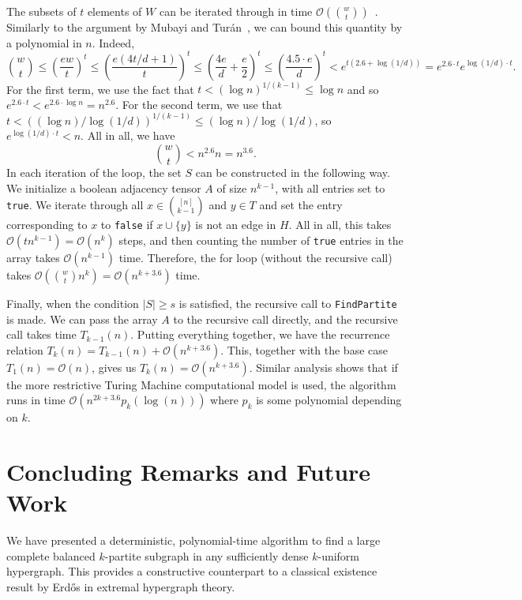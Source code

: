 \documentclass{amsart}
\newcommand{\bigO}[1]{\ensuremath{\mathcal{O}\left(#1\right)}}
\begin{document}
    The subsets of $t$ elements of $W$ can be iterated through in time $\bigO{\binom{w}{t}}$~\cite{reingold1977combinatorial}.
    Similarly to the argument by Mubayi and Tur\'{a}n~\cite{MUBAYI2010174}, we can bound this quantity by a polynomial in $n$.
    Indeed,
    \[
        \binom{w}{t} \leq \left(\frac{ew}{t}\right)^t
        \leq \left(\frac{e(4t/d + 1)}{t}\right)^t
        \leq \left(\frac{4e}{d} + \frac{e}{2}\right)^t
        \leq \left(\frac{4.5 \cdot e}{d}\right)^t < e^{t(2.6 + \log (1/d))}
        = e^{2.6 \cdot t} e^{\log (1/d) \cdot t}.
    \]
    For the first term, we use the fact that $t < (\log n)^{1/(k-1)} \leq \log n$
    and so ${e^{2.6 \cdot t} < e^{2.6 \cdot \log n} = n^{2.6}}$.
    For the second term, we use that $t < ((\log n)/\log(1/d))^{1/(k-1)} \leq (\log n)/\log(1/d)$,
    so $e^{\log (1/d) \cdot t} < n$.
    All in all, we have
    \[
        \binom{w}{t} < n^{2.6} n = n^{3.6}.
    \]
    In each iteration of the loop, the set $S$ can be constructed in the following way.
    We initialize a boolean adjacency tensor $A$ of size $n^{k-1}$,
    with all entries set to \texttt{true}.
    We iterate through all $x \in \binom{[n]}{k-1}$ and $y \in T$
    and set the entry corresponding to $x$ to \texttt{false} if $x \cup \{y\}$ is not an edge in $H$.
    All in all, this takes $\bigO{tn^{k-1}} = \bigO{n^k}$ steps, and then counting the number of \texttt{true} entries in the array takes $\bigO{n^{k-1}}$ time.
    Therefore, the for loop (without the recursive call) takes $\bigO{\binom{w}{t} n^{k}} = \bigO{n^{k+3.6}}$ time.

    Finally, when the condition $|S| \geq s$ is satisfied, the recursive call to \texttt{FindPartite} is made.
    We can pass the array $A$ to the recursive call directly, and the recursive call takes time $T_{k-1}(n)$.
    Putting everything together, we have the recurrence relation $T_k(n) = T_{k-1}(n) + \bigO{n^{k+3.6}}$.
    This, together with the base case $T_1(n) = \bigO{n}$, gives us $T_k(n) = \bigO{n^{k+3.6}}$.
    Similar analysis shows that if the more restrictive Turing Machine computational model is used,
    the algorithm runs in time $\bigO{n^{2k + 3.6} p_k(\log(n))}$ where $p_k$ is some polynomial depending on $k$.

    \section{Concluding Remarks and Future Work}\label{sec:conclusion-and-future-work}

    We have presented a deterministic,
    polynomial-time algorithm to find a large complete balanced $k$-partite subgraph in any sufficiently dense $k$-uniform hypergraph.
    This provides a constructive counterpart to a classical existence result by Erd\H{o}s in extremal hypergraph theory.
\end{document}
